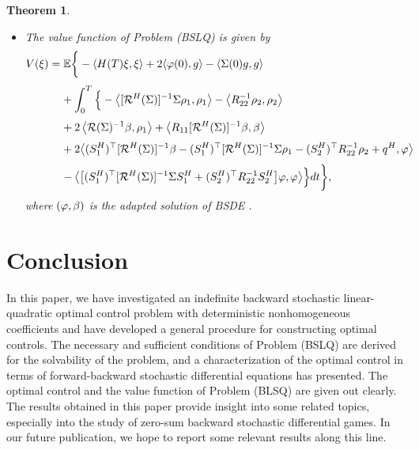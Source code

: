 \documentclass[11pt,times,twoside]{article}
\def\dbE{\mathbb{E}} \def\sE{\mathscr{E}} \def\fE{\mathfrak{E}} \def\cE{{\cal E}} \def\BE{{\bf E}} \def\Be{{\bf e}}
\def\b{\beta}         \def\D{\Delta}   \def\d{\delta}   \def\F{\Phi}     \def\p{\phi}
\def\ba{\begin{aligned}}              \def\ea{\end{aligned}}
\newtheorem{theorem}{Theorem}[section]
\begin{document}
\begin{theorem}
\begin{itemize}
%
$$\left\{\ba
\ds & \dot{\Si} -A \Si-\Si A^{\top}+\mathcal{B}^{H}(\Si)\lt[R_{22}\rt]^{-1}\lt[\cB^{H}(\Si)\rt]^{\top} \\
\ns\ds &\hp{\dot{\Si}} +\cC^{H}(\Si)\left[\cR^{H}(\Si)\right]^{-1} \Si\left[\cC^{H}(\Si)\right]^{\top}=0, \\
\ns\ds & \Si(T) =0.
\ea\right.$$
%
\item [(ii)] The value function of Problem (BSLQ) is given by
%
\begin{equation*}\begin{aligned}
\ds V(\xi) &= \dbE\bigg\{-\lan H(T)\xi,\xi\ran+2\lan\f(0),g\ran-\lan\Si(0)g,g\ran \\
\ns\ds &\hp{=\ } +\int_{0}^{T} \Big\{-\left\lan[\cR^H(\Si)]^{-1}\Si\rho_1,\rho_1\right\ran
 -\left\lan R_{22}^{-1}\rho_2,\rho_2 \right\ran\\
\ns\ds &\hp{=\ }
 +2\left\lan\cR(\Si)^{-1}\beta, \rho_1 \right\ran +\left\lan R_{11} [\cR^H(\Si)]^{-1} \beta,\beta\right\ran\\
%
\ns\ds &\hp{=\ } +2\big\lan (S^H_{1})^{\top} [\cR^H(\Si)]^{-1} \beta
-(S^H_{1})^{\top} [\cR^H(\Si)]^{-1} \Si\rho_1-(S_{2}^H)^{\top} R_{22}^{-1}\rho_2+q^H, \varphi\big\ran\\
%
\ns\ds &\hp{=\ } -\big\lan\big[(S^H_{1})^{\top} [\cR^H(\Si)]^{-1} \Si S_{1}^H
+(S_{2}^H)^{\top} R_{22}^{-1} S^H_{2}\big] \varphi, \varphi\big\ran\Big\} d t\bigg\},
\end{aligned}\end{equation*}
%
where $(\f,\b)$ is the adapted solution of BSDE .
%
\end{itemize}
%
\end{theorem}


\section{Conclusion}

In this paper, we have investigated an indefinite backward stochastic linear-quadratic optimal
control problem with deterministic nonhomogeneous coefficients and have developed a general procedure
for constructing optimal controls.
The necessary and sufficient conditions of Problem (BSLQ) are derived for the solvability of the problem, and a characterization of the optimal control in terms of forward-backward stochastic differential equations has presented. The optimal control and the value function of Problem (BLSQ) are given out clearly.
The results obtained in this paper provide insight into some related topics, especially into
the study of zero-sum backward stochastic differential games.
In our future publication, we hope to report some relevant results along this line.
\end{document}
